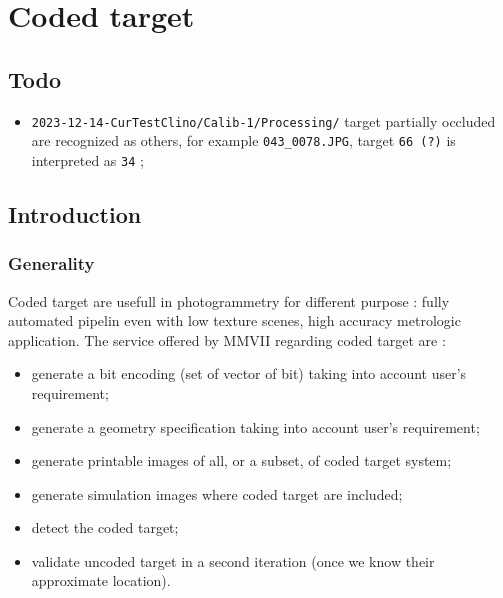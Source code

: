 \chapter{Coded target}
\label{Chap:CodedTarget}


\section{Todo}

\begin{itemize}
      \item  {\tt 2023-12-14-CurTestClino/Calib-1/Processing/}  target partially occluded are recognized as others,
	      for example {\tt 043\_0078.JPG}, target {\tt 66 (?)} is interpreted as {\tt 34} ;
\end{itemize}



\section{Introduction}


\subsection{Generality}

Coded target are usefull in photogrammetry for different purpose : 
fully automated pipelin even with low texture scenes, high accuracy metrologic application.
The service offered by MMVII regarding coded target are :

\begin{itemize}
    \item generate a bit encoding (set of vector of bit) taking into account 
           user's requirement;

    \item generate a geometry specification taking into account
           user's requirement;

    \item generate printable images of all, or a subset, of coded target system;

    \item generate simulation images where coded target are included;

    \item detect the coded target;

    \item validate uncoded target in a second iteration  (once we know their approximate location).

\end{itemize}


